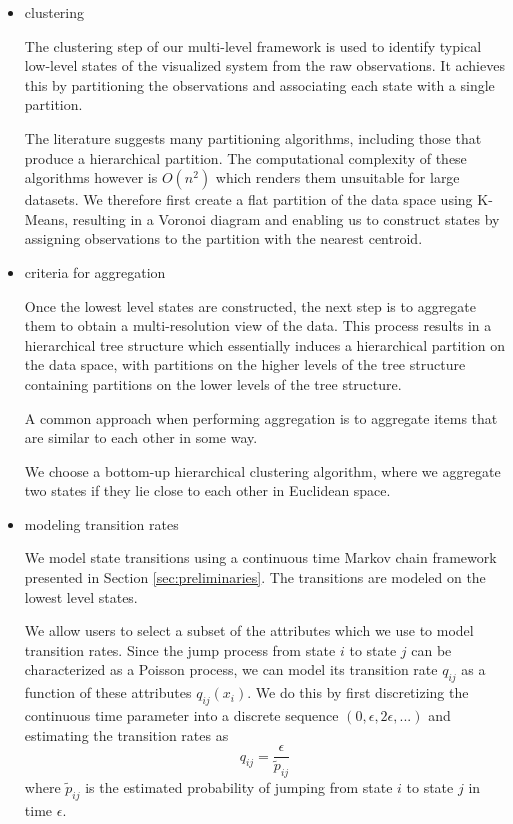 \begin{itemize}
	\item clustering
	
	The clustering step of our multi-level framework is used to identify typical low-level states
	of the visualized system from the raw observations. It achieves this by partitioning the
	observations and associating each state with a single partition.
	
	The literature suggests many partitioning algorithms, including those that produce a hierarchical 
	partition. The computational complexity of these algorithms however is $O(n^2)$ which renders 
	them unsuitable for large datasets. We therefore first create a flat partition of the data space
	using K-Means, resulting in a Voronoi diagram and enabling us to construct states by assigning
	observations to the partition with the nearest centroid.
	
	
	\item criteria for aggregation 
	
	Once the lowest level states are constructed, the next step is to aggregate them to obtain a
	multi-resolution view of the data. This process results in a hierarchical tree structure
	which essentially induces a hierarchical partition on the data space, with partitions
	on the higher levels of the tree structure containing partitions on the lower levels of the
	tree structure.
	
	 A common approach when performing aggregation is to aggregate
	items that are similar to each other in some way.
	
	We choose a bottom-up hierarchical clustering algorithm,
	where we aggregate two states if they lie close to each other in Euclidean space.
	
	\item modeling transition rates
	
	We model state transitions using a continuous time Markov chain framework presented in Section
	\ref{sec:preliminaries}. The transitions are modeled on the lowest level states.
	
	We allow users to select a subset of the attributes which we use to model transition rates.
	Since the jump process from state $i$ to state $j$ can be characterized as a Poisson process,
	we can model its transition rate $q_{ij}$ as a function of these attributes $q_{ij}(x_i)$.
	We do this by first discretizing the continuous time parameter into a discrete sequence
	$(0, \epsilon, 2\epsilon, ...)$ and estimating the transition rates as
	\begin{equation}
		q_{ij} = \frac{\epsilon}{\tilde{p}_{ij}}
	\end{equation}
	where $\tilde{p}_{ij}$ is the estimated probability of jumping from state $i$ to state $j$
	in time $\epsilon$.
	

\end{itemize}
